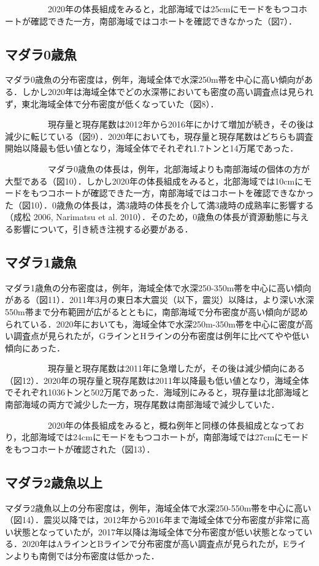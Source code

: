 \documentclass[11pt]{article} %
\begin{document}
\begin{linenumbers}
\ \ \ \ \ \ \ \ \ \ 
2020年の体長組成をみると，北部海域では25cmにモードをもつコホートが確認できた一方，南部海域ではコホートを確認できなかった（図7）．


\subsection{マダラ0歳魚}
マダラ0歳魚の分布密度は，例年，海域全体で水深250m帯を中心に高い傾向がある．しかし2020年は海域全体でどの水深帯においても密度の高い調査点は見られず，東北海域全体で分布密度が低くなっていた（図8）．

\ \ \ \ \ \ \ \ \ \ 
現存量と現存尾数は2012年から2016年にかけて増加が続き，その後は減少に転じている（図9）．2020年においても，現存量と現存尾数はどちらも調査開始以降最も低い値となり，海域全体でそれぞれ1.7トンと14万尾であった．

\ \ \ \ \ \ \ \ \ \ 
マダラ0歳魚の体長は，例年，北部海域よりも南部海域の個体の方が大型である（図10）．しかし2020年の体長組成をみると，北部海域では10cmにモードをもつコホートが確認できた一方，南部海域ではコホートを確認できなかった（図10）．0歳魚の体長は，満3歳時の体長を介して満3歳時の成熟率に影響する（成松 2006, Narimatsu et al. 2010）．そのため，0歳魚の体長が資源動態に与える影響について，引き続き注視する必要がある．


\subsection{マダラ1歳魚}
マダラ1歳魚の分布密度は，例年，海域全体で水深250-350m帯を中心に高い傾向がある（図11）．2011年3月の東日本大震災（以下，震災）以降は，より深い水深550m帯まで分布範囲が広がるとともに，南部海域で分布密度が高い傾向が認められている．2020年においても，海域全体で水深250m-350m帯を中心に密度が高い調査点が見られたが，GラインとHラインの分布密度は例年に比べてやや低い傾向にあった．

\ \ \ \ \ \ \ \ \ \ 
現存量と現存尾数は2011年に急増したが，その後は減少傾向にある（図12）．2020年の現存量と現存尾数は2011年以降最も低い値となり，海域全体でそれぞれ1036トンと502万尾であった．海域別にみると，現存量は北部海域と南部海域の両方で減少した一方，現存尾数は南部海域で減少していた．

\ \ \ \ \ \ \ \ \ \ 
2020年の体長組成をみると，概ね例年と同様の体長組成となっており，北部海域では24cmにモードをもつコホートが，南部海域では27cmにモードをもつコホートが確認された（図13）．


\subsection{マダラ2歳魚以上}
マダラ2歳魚以上の分布密度は，例年，海域全体で水深250-550m帯を中心に高い（図14）．震災以降では，2012年から2016年まで海域全体で分布密度が非常に高い状態となっていたが，2017年以降は海域全体で分布密度が低い状態となっている．2020年はAラインとBラインで分布密度が高い調査点が見られたが，Eラインよりも南側では分布密度は低かった．


\end{linenumbers}
\end{document}
